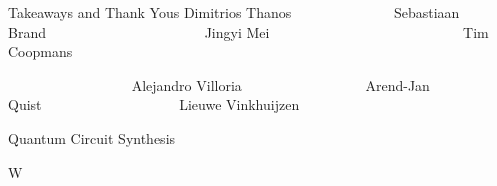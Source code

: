 \begin{refsection}
\begin{frame}{Takeaways and Thank Yous}
\footnotesize
Dimitrios Thanos~~~~~~~~~~~~~~
Sebastiaan Brand~~~~~~~~~~~~~~~~~~~~~~ 
Jingyi Mei~~~~~~~~~~~~~~~~~~~~~~~~~~~
Tim Coopmans

\vspace{-2ex}
~~~~~~~~~~~~~~~~~
Alejandro Villoria~~~~~~~~~~~~~~~~~
Arend-Jan Quist~~~~~~~~~~~~~~~~~~~
Lieuwe Vinkhuijzen


\vspace{-1em}



%



\printbibliography[section=\therefsection]
\end{frame}
\end{refsection}




\begin{frame}{Quantum Circuit Synthesis}
	
	W
	
\end{frame}



